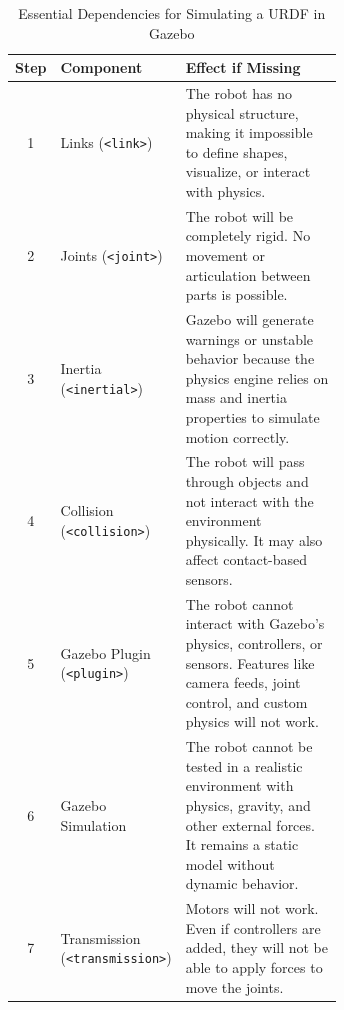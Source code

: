 \documentclass[../../main]{subfiles}
\begin{document}
\renewcommand{\arraystretch}{1.4} %
\begin{table}[ht]
    \centering
\begin{tcolorbox}[
    colback=red!5!white,colframe=red!75!black,
    title={\textbf{Dependencies for URDF Simulation in Gazebo}},
    fonttitle=\bfseries, coltitle=white, width=\linewidth
]

\centering
\begin{adjustbox}{max width=\linewidth} %
\begin{tabular}{c|l|p{0.65\linewidth}} %
    
    \rowcolor{red!20} 
    \textbf{Step} & \textbf{Component} & \textbf{Effect if Missing} \\
    \midrule
    1 & Links (\texttt{<link>}) & The robot has no physical structure, making it impossible to define shapes, visualize, or interact with physics. \\
    2 & Joints (\texttt{<joint>}) & The robot will be completely rigid. No movement or articulation between parts is possible. \\
    3 & Inertia (\texttt{<inertial>}) & Gazebo will generate warnings or unstable behavior because the physics engine relies on mass and inertia properties to simulate motion correctly. \\
    4 & Collision (\texttt{<collision>}) & The robot will pass through objects and not interact with the environment physically. It may also affect contact-based sensors. \\
    5 & Gazebo Plugin (\texttt{<plugin>}) & The robot cannot interact with Gazebo’s physics, controllers, or sensors. Features like camera feeds, joint control, and custom physics will not work. \\
    6 & Gazebo Simulation & The robot cannot be tested in a realistic environment with physics, gravity, and other external forces. It remains a static model without dynamic behavior. \\
    7 & Transmission (\texttt{<transmission>}) & Motors will not work. Even if controllers are added, they will not be able to apply forces to move the joints. \\
\end{tabular}
\end{adjustbox}
\end{tcolorbox}
\caption{Essential Dependencies for Simulating a URDF in Gazebo}  %
\end{table}
\newpage
\end{document}
